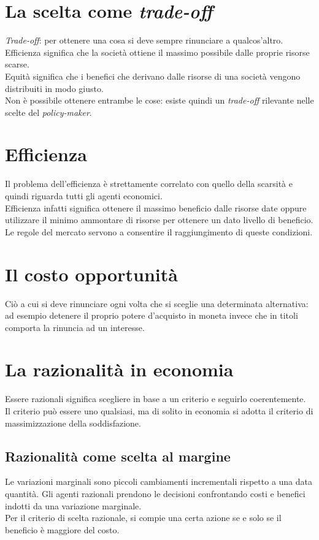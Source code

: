 \documentclass{report}
\begin{document}
	\section{La scelta come \textit{trade-off}}
	\textit{Trade-off}: per ottenere una cosa si deve sempre rinunciare a qualcos'altro.\\Efficienza significa che la società ottiene il massimo possibile dalle proprie risorse scarse.\\Equità significa che i benefici che derivano dalle risorse di una società vengono distribuiti in modo giusto.\\Non è possibile ottenere entrambe le cose: esiste quindi un \textit{trade-off} rilevante nelle scelte del \textit{policy-maker}.
	\section{Efficienza}
	Il problema dell'efficienza è strettamente correlato con quello della scarsità e quindi riguarda tutti gli agenti economici.\\Efficienza infatti significa ottenere il massimo beneficio dalle risorse date oppure utilizzare il minimo ammontare di risorse per ottenere un dato livello di beneficio.\\Le regole del mercato servono a consentire il raggiungimento di queste condizioni.
	\section{Il costo opportunità}
	Ciò a cui si deve rinunciare ogni volta che si sceglie una determinata alternativa: ad esempio detenere il proprio potere d'acquisto in moneta invece che in titoli comporta la rinuncia ad un interesse.
	\section{La razionalità in economia}
	Essere razionali significa scegliere in base a un criterio e seguirlo coerentemente. Il criterio può essere uno qualsiasi, ma di solito in economia si adotta il criterio di massimizzazione della soddisfazione.
	\subsection{Razionalità come scelta al margine}
	Le variazioni marginali sono piccoli cambiamenti incrementali rispetto a una data quantità. Gli agenti razionali prendono le decisioni confrontando costi e benefici indotti da una variazione marginale.\\Per il criterio di scelta razionale, si compie una certa azione se e solo se il beneficio è maggiore del costo.
\end{document}
